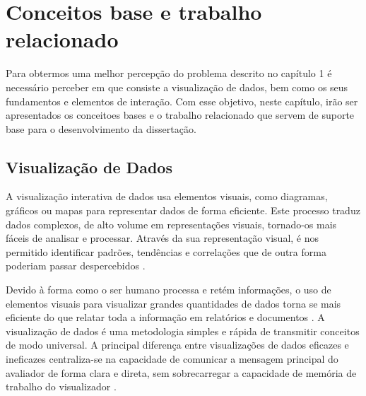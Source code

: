 
%

\chapter{Conceitos base e trabalho relacionado}
\label{cha:conceitos_base}

Para obtermos uma melhor percepção do problema descrito no capítulo 1 é necessário perceber em que consiste a visualização de dados, bem como os seus fundamentos e elementos de interação.
Com esse objetivo, neste capítulo, irão ser apresentados os conceitoes bases e o trabalho relacionado que servem de suporte base para o desenvolvimento da dissertação.

\section{Visualização de Dados}
\label{sec:vis_dados}


A visualização interativa de dados usa elementos visuais, como diagramas, gráficos ou mapas para representar dados de forma eficiente. Este processo traduz dados complexos, de alto volume em representações visuais, tornado-os mais fáceis de analisar e processar. Através da sua representação visual, é nos permitido identificar padrões, tendências e correlações que de outra forma poderiam passar despercebidos \cite{keim2002information}.

Devido à forma como o ser humano processa e retém informações, o uso de elementos visuais para visualizar grandes quantidades de dados torna se mais eficiente do que relatar toda a informação em relatórios e documentos \cite{ware2019information}. A visualização de dados é uma metodologia simples e rápida de transmitir conceitos de modo universal.
A principal diferença entre visualizações de dados eficazes e ineficazes centraliza-se na capacidade de comunicar a mensagem principal do avaliador de forma clara e direta, sem sobrecarregar a capacidade de memória de trabalho do visualizador \cite{evergreen2013design}.

